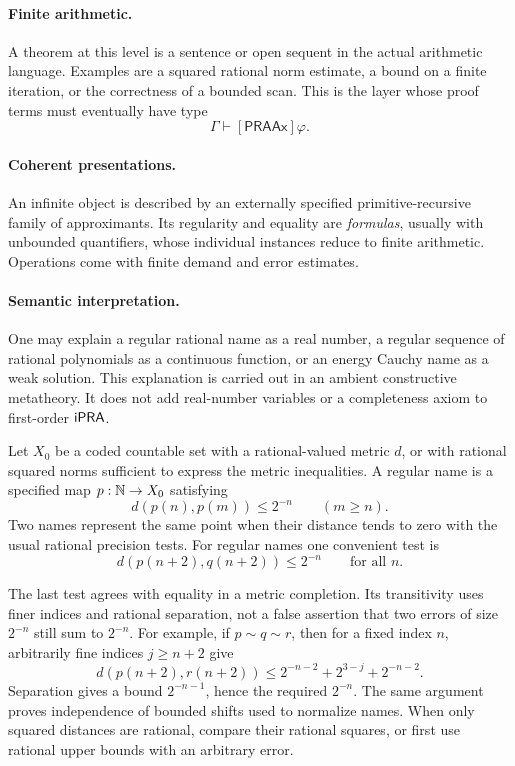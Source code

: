 \paragraph{Finite arithmetic.}
A theorem at this level is a sentence or open sequent in the actual arithmetic
language. Examples are a squared rational norm estimate, a bound on a finite
iteration, or the correctness of a bounded scan. This is the layer whose
proof terms must eventually have type
\[
                  \Gamma\vdash[\mathsf{PRAAx}]\varphi.
\]

\paragraph{Coherent presentations.}
An infinite object is described by an externally specified primitive-recursive
family of approximants. Its regularity and equality are \emph{formulas}, usually
with unbounded quantifiers, whose individual instances reduce to finite
arithmetic. Operations come with finite demand and error estimates.

\paragraph{Semantic interpretation.}
One may explain a regular rational name as a real number, a regular sequence
of rational polynomials as a continuous function, or an energy Cauchy name
as a weak solution. This explanation is carried out in an ambient constructive
metatheory. It does not add real-number variables or a completeness axiom to
first-order \(\mathsf{iPRA}\).

\begin{definition}
\label{def:regular}
Let \(X_0\) be a coded countable set with a rational-valued metric \(d\), or
with rational squared norms sufficient to express the metric inequalities.
A regular name is a specified map \(p:\mathbb N\to X_0\) satisfying
\[
       d(p(n),p(m))\leq2^{-n}\qquad(m\geq n).
\]
Two names represent the same point when their distance tends to zero with
the usual rational precision tests. For regular names one convenient test is
\[
       d(p(n+2),q(n+2))\leq2^{-n}\qquad\text{for all }n.
\]
\end{definition}

The last test agrees with equality in a metric completion. Its transitivity
uses finer indices and rational separation, not a false assertion that
two errors of size \(2^{-n}\) still sum to \(2^{-n}\).
For example, if \(p\sim q\sim r\), then for a fixed index \(n\), arbitrarily
fine indices \(j\geq n+2\) give
\[
d(p(n+2),r(n+2))
 \leq 2^{-n-2}+2^{3-j}+2^{-n-2}.
\]
Separation gives a bound \(2^{-n-1}\), hence the required \(2^{-n}\).
The same argument proves independence of bounded shifts used to normalize
names. When only squared distances are rational, compare their rational
squares, or first use rational upper bounds with an arbitrary error.

